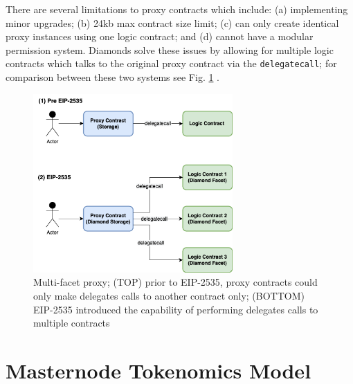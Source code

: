 \documentclass[journal,twocolumn,12pt]{ieeesyscoin}
\begin{document}
There are several limitations to proxy contracts which include: (a) implementing minor upgrades; (b) 24kb max contract size limit; (c) can only create identical proxy instances using one logic contract; and (d) cannot have a modular permission system. Diamonds solve these issues by allowing for multiple logic contracts which talks to the original proxy contract via the \texttt{delegatecall}; for comparison between these two systems see Fig. \ref{fig:diamonds} .

\begin{figure}[h!]
\includegraphics[width=3in]{img/diamonds.png}
\caption{Multi-facet proxy; (TOP) prior to EIP-2535, proxy contracts could only make delegates calls to another contract only; (BOTTOM) EIP-2535 introduced the capability of performing delegates calls to multiple contracts} 
\label{fig:diamonds}
\end{figure} 

\section{Masternode Tokenomics Model}
\label{sec:masternode_tokenomics}
\end{document}
